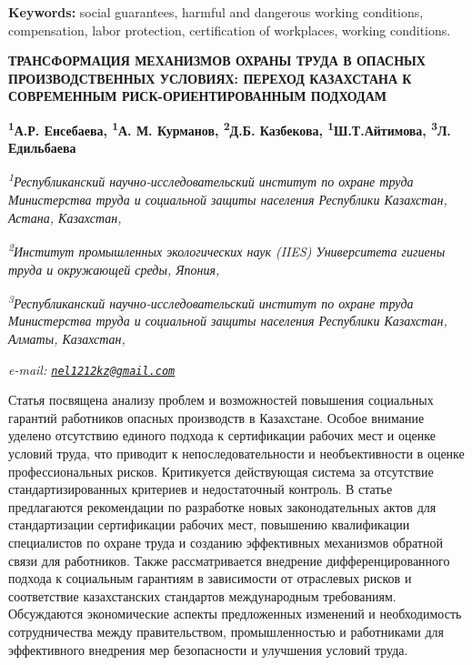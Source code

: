 {\bfseries Keywords:} social guarantees, harmful and dangerous working
conditions, compensation, labor protection, certification of workplaces,
working conditions.

\begin{articleheader}
{\bfseries ТРАНСФОРМАЦИЯ МЕХАНИЗМОВ ОХРАНЫ ТРУДА В ОПАСНЫХ ПРОИЗВОДСТВЕННЫХ
УСЛОВИЯХ: ПЕРЕХОД КАЗАХСТАНА К СОВРЕМЕННЫМ РИСК-ОРИЕНТИРОВАННЫМ
ПОДХОДАМ}

{\bfseries
\textsuperscript{1}А.Р. Енсебаева\textsuperscript{\envelope },
\textsuperscript{1}А. М. Курманов,
\textsuperscript{2}Д.Б. Казбекова,
\textsuperscript{1}Ш.Т.Айтимова,
\textsuperscript{3}Л. Едильбаева}
\end{articleheader}

\begin{affiliation}
\emph{\textsuperscript{1}Республиканский научно-исследовательский
институт по охране труда Министерства труда и социальной защиты
населения Республики Казахстан, Астана, Казахстан,}

\emph{\textsuperscript{2}Институт промышленных экологических наук (IIES)
Университета гигиены труда и окружающей среды, Япония,}

\emph{\textsuperscript{3}Республиканский научно-исследовательский
институт по охране труда Министерства труда и социальной защиты
населения Республики Казахстан, Алматы, Казахстан,}

\emph{e-mail:
\href{mailto:nel1212kz@gmail.com}{\nolinkurl{nel1212kz@gmail.com}}}
\end{affiliation}

Статья посвящена анализу проблем и возможностей повышения социальных
гарантий работников опасных производств в Казахстане. Особое внимание
уделено отсутствию единого подхода к сертификации рабочих мест и оценке
условий труда, что приводит к непоследовательности и необъективности в
оценке профессиональных рисков. Критикуется действующая система за
отсутствие стандартизированных критериев и недостаточный контроль. В
статье предлагаются рекомендации по разработке новых законодательных
актов для стандартизации сертификации рабочих мест, повышению
квалификации специалистов по охране труда и созданию эффективных
механизмов обратной связи для работников. Также рассматривается
внедрение дифференцированного подхода к социальным гарантиям в
зависимости от отраслевых рисков и соответствие казахстанских стандартов
международным требованиям. Обсуждаются экономические аспекты
предложенных изменений и необходимость сотрудничества между
правительством, промышленностью и работниками для эффективного внедрения
мер безопасности и улучшения условий труда.

